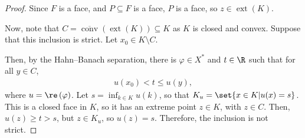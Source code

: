 \documentclass[10pt]{mypackage}
\begin{document}
\begin{proof}
  Since $F$ is a face, and $P\subseteq F$ is a face, $P$ is a face, so $z\in \operatorname{ext}\left( K \right)$.\newline

  Now, note that $C = \overline{\operatorname{conv}}\left( \operatorname{ext}\left( K \right) \right)\subseteq K$ as $K$ is closed and convex. Suppose that this inclusion is strict. Let $x_0\in K\setminus C$.\newline

  Then, by the Hahn--Banach separation, there is $\varphi\in X^{\ast}$ and $t\in\R$ such that for all $y\in C$,
  \begin{align*}
    u\left( x_0 \right) < t \leq u(y),
  \end{align*}
  where $u = \re\left( \varphi \right)$. Let $s = \inf_{k\in K}u(k)$, so that $K_u = \set{x\in K | u(x) = s}$. This is a closed face in $K$, so it has an extreme point $z\in K$, with $z\in C$. Then, $u(z) \geq t > s$, but $z\in K_u$, so $u(z) = s$. Therefore, the inclusion is not strict.
\end{proof}
\end{document}
